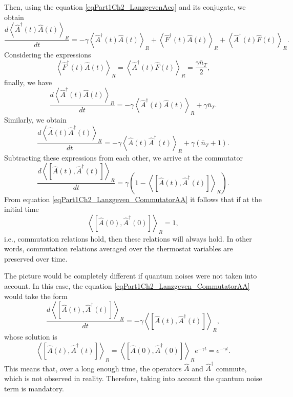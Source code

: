 Then, using the equation \eqref{eqPart1Ch2_LanzgevenAeq} and its conjugate, we obtain
\begin{equation}
\frac{d \left<\hat{A}^{\dag}\left(t\right)\hat{A}\left(t\right)\right>_R}{d
t}=
- \gamma \left<\hat{A}^{\dag}\left(t\right)\hat{A}\left(t\right)\right>_R
+ \left<\hat{F}^{\dag}\left(t\right)\hat{A}\left(t\right)\right>_R + 
\left<\hat{A}^{\dag}\left(t\right)\hat{F}\left(t\right)\right>_R.
\nonumber
\end{equation}
Considering the expressions 
\begin{equation}
\left<\hat{F}^{\dag}\left(t\right)\hat{A}\left(t\right)\right>_R =
\left<\hat{A}^{\dag}\left(t\right)\hat{F}\left(t\right)\right>_R = 
\frac{\gamma \bar{n}_T}{2},
\nonumber
\end{equation}
finally, we have
\begin{equation}
\frac{d \left<\hat{A}^{\dag}\left(t\right)\hat{A}\left(t\right)\right>_R}{d
t}=
- \gamma \left<\hat{A}^{\dag}\left(t\right)\hat{A}\left(t\right)\right>_R
+ \gamma \bar{n}_T.
\nonumber
\end{equation}
Similarly, we obtain
\begin{equation}
\frac{d \left<\hat{A}\left(t\right)\hat{A}^{\dag}\left(t\right)\right>_R}{d
t}=
- \gamma \left<\hat{A}\left(t\right)\hat{A}^{\dag}\left(t\right)\right>_R
+ \gamma \left(\bar{n}_T + 1\right).
\label{eqPart1Ch2_Lanzgeven_Task3}
\end{equation}
Subtracting these expressions from each other, we arrive at the commutator
\begin{equation}
\frac{d \left<\left[\hat{A}\left(t\right),\hat{A}^{\dag}\left(t\right)\right]\right>_R}{d
t}=
\gamma \left( 1 - \left<\left[\hat{A}\left(t\right),\hat{A}^{\dag}\left(t\right)\right]\right>_R
\right).
\label{eqPart1Ch2_Lanzgeven_CommutatorAA}
\end{equation}
From equation \eqref{eqPart1Ch2_Lanzgeven_CommutatorAA} it follows that
if at the initial time 
\[
\left<\left[\hat{A}\left(0\right),\hat{A}^{\dag}\left(0\right)\right]\right>_R
= 1,
\]
i.e., commutation relations hold, then these relations will always hold. In other words, commutation relations averaged over the thermostat variables are preserved over time. 

The picture would be completely different if quantum noises were not taken into account. In this case, the equation
\eqref{eqPart1Ch2_Lanzgeven_CommutatorAA} would take the form
\begin{equation}
\frac{d \left<\left[\hat{A}\left(t\right),\hat{A}^{\dag}\left(t\right)\right]\right>_R}{d
t}=
- \gamma \left<\left[\hat{A}\left(t\right),\hat{A}^{\dag}\left(t\right)\right]\right>_R,
\nonumber
\end{equation}
whose solution is
\begin{equation}
\left<\left[\hat{A}\left(t\right),\hat{A}^{\dag}\left(t\right)\right]\right>_R
= 
\left<\left[\hat{A}\left(0\right),\hat{A}^{\dag}\left(0\right)\right]\right>_R
e^{- \gamma t}= e^{- \gamma t}.
\nonumber
\end{equation}
This means that, over a long enough time, the operators $\hat{A}$ and
$\hat{A}^{\dag}$ commute, which is not observed in reality. Therefore, taking into account the quantum noise term is mandatory.



